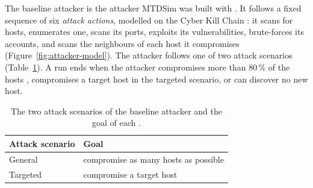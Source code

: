 \documentclass{cshonours}
\newcommand{\tablestyle}{\footnotesize\renewcommand{\arraystretch}{1.0}\rowcolors{2}{}{black!5}}
\begin{document}
The baseline attacker is the attacker MTDSim was built with
\citep{brown2023}. It follows a fixed sequence of six \emph{attack actions}, modelled on
the Cyber Kill Chain \citep{brown2023, hutchins2011}: it scans for hosts,
enumerates one, scans its ports, exploits its vulnerabilities, brute-forces
its accounts, and scans the neighbours of each host it compromises
(Figure~\ref{fig:attacker-model}). The
attacker follows one of two attack scenarios
(Table~\ref{tab:attacker-objectives}).
A run ends when the attacker compromises more than 80\,\% of the hosts
\citep{zhang2023}, compromises a target host in the targeted scenario, or can
discover no new host.

\begin{table}[t]
  \centering
  \caption[The two attack scenarios of the baseline attacker]{The two
  attack scenarios of the baseline attacker and the goal of each
  \citep{brown2023}.}
  \label{tab:attacker-objectives}
  \tablestyle
  \begin{tabular}{@{}ll@{}}
    \toprule
    Attack scenario & Goal \\
    \midrule
    General & compromise as many hosts as possible \\
    Targeted & compromise a target host \\
    \bottomrule
  \end{tabular}
\end{table}
\end{document}
